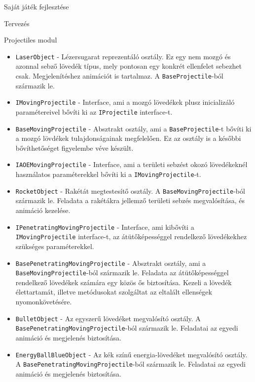 \begin{MyChapter}{Saját játék fejlesztése}
\begin{MySection}{Tervezés}
\begin{MySubSection}{Projectiles modul}
\begin{itemize}
				\item \texttt{LaserObject} - Lézersugarat reprezentáló osztály. Ez egy nem mozgó és azonnal sebző lövedék típus, mely pontosan egy konkrét ellenfelet sebezhet csak. Megjelenítéshez animációt is tartalmaz. A \texttt{BaseProjectile}-ból származik le.

				\item \texttt{IMovingProjectile} - Interface, ami a mozgó lövedékek plusz inicializáló paramétereivel bővíti ki az \texttt{IProjectile} interface-t.

				\item \texttt{BaseMovingProjectile} - Absztrakt osztály, ami a \texttt{BaseProjectile}-t bővíti ki a mozgó lövdékek tulajdonságainak megfelelően. Ez az osztály is a későbbi bővíthetőséget figyelembe véve készült.

				\item \texttt{IAOEMovingProjectile} - Interface, ami a területi sebzést okozó lövedékeknél használatos paraméterekkel bővíti ki a \texttt{IMovingProjectile}-t.

				\item \texttt{RocketObject} - Rakétát megtestesítő osztály. A \texttt{BaseMovingProjectile}-ból származik le. Feladata a rakétákra jellemző területi sebzés megvalósítása, és animáció kezelése.

				\item \texttt{IPenetratingMovingProjectile} - Interface, ami kibővíti a \texttt{IMovingProjectile} interface-t, az átütőképességgel rendelkező lövedékekhez szükséges paraméterekkel.

				\item \texttt{BasePenetratingMovingProjectile} - Absztrakt osztály, ami a \texttt{Base\-Moving\-Projectile}-ból származik le. Feladata az átütőképességgel rendelkező lövedékek számára egy közös ős biztosítása. Kezeli a lövedék élettartamát, illetve metódusokat szolgáltat az eltalált ellenségek nyomonkövetésére.

				\item \texttt{BulletObject} - Az egyszerű lövedéket megvalósító osztály. A \texttt{Base\-Penetrating\-Moving\-Projectile}-ból származik le. Feladatai az egyedi animáció és megjelenés biztosítása.

				\item \texttt{EnergyBallBlueObject} - Az kék színű energia-lövedéket megvalósító osztály. A \texttt{Base\-Penetrating\-Moving\-Projectile}-ból származik le. Feladatai az egyedi animáció és megjelenés biztosítása.


\end{itemize}
\end{MySubSection}
\end{MySection}
\end{MyChapter}
